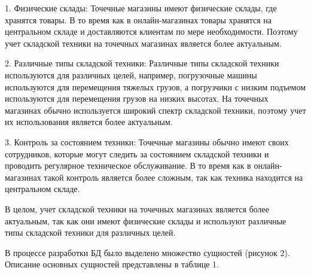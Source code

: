 \documentclass[14pt]{extreport}
\begin{document}
1. Физические склады: Точечные магазины имеют физические склады, где хранятся товары. В то время как в онлайн-магазинах товары хранятся на центральном складе и доставляются клиентам по мере необходимости. Поэтому учет складской техники на точечных магазинах является более актуальным.

2. Различные типы складской техники: Различные типы складской техники используются для различных целей, например, погрузочные машины используются для перемещения тяжелых грузов, а погрузчики с низким подъемом используются для перемещения грузов на низких высотах. На точечных магазинах обычно используется широкий спектр складской техники, поэтому учет их использования является более актуальным.

3. Контроль за состоянием техники: Точечные магазины обычно имеют своих сотрудников, которые могут следить за состоянием складской техники и проводить регулярное техническое обслуживание. В то время как в онлайн-магазинах такой контроль является более сложным, так как техника находится на центральном складе.

В целом, учет складской техники на точечных магазинах является более актуальным, так как они имеют физические склады и используют различные типы складской техники для различных целей.


В процессе разработки БД было выделено множество сущностей (рисунок 2).  Описание основных сущностей представлены в таблице 1.
\end{document}
